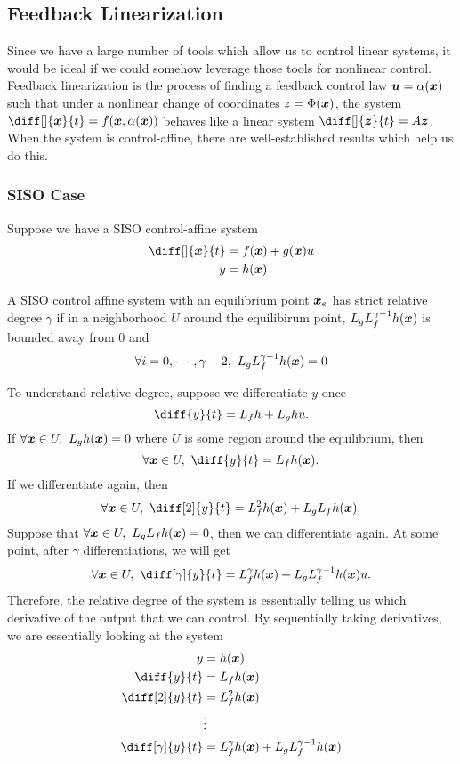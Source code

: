 \subsection{Feedback Linearization}
Since we have a large number of tools which allow us to control linear systems,
it would be ideal if we could somehow leverage those tools for nonlinear
control. Feedback linearization is the process of finding a feedback control law $\boldsymbol{u} =
\alpha(\boldsymbol{x})$ such that under a nonlinear change of coordinates $z =
\Phi(\boldsymbol{x})$, the system $\diff[]{\bs{x}}{t} = f(\bs{x}, \alpha(\bs{x}))$ behaves like a linear
system $\diff[]{\bs{z}}{t} = A\bs{z}$. When the system is control-affine, there
are well-established results which help us do this.

\subsubsection{SISO Case}
Suppose we have a SISO control-affine system \[
	\begin{aligned}
		\diff[]{\bs{x}}{t} &= f(\bs{x}) + g(\bs{x})u\\
		y &= h(\bs{x})
	\end{aligned}
\]
\begin{definition}
	A SISO control affine system with an equilibrium point $\boldsymbol{x}_e$ has
	strict relative degree $\gamma$ if in a neighborhood $U$ around the
	equilibirum point, $L_gL_f^{\gamma-1}h(\boldsymbol{x})$ is bounded away from 0 and \[
		\forall i=0,\cdots,\gamma-2,\ L_gL_f^{\gamma - 1}h(\bs{x}) = 0
	\]
	\label{defn:strict-relative-degree}
\end{definition}
To understand relative degree, suppose we differentiate $y$ once \[
	\diff{y}{t} = L_fh + L_gh u.
\]
If $\forall \boldsymbol{x}\in U,\ L_gh(\boldsymbol{x}) = 0$ where $U$ is some region around the
equilibrium, then \[
	\forall \bs{x}\in U,\ \diff{y}{t} = L_fh(\bs{x}).
\]
If we differentiate again, then \[
	\forall \bs{x}\in U,\ \diff[2]{y}{t} = L_f^2h(\bs{x}) + L_gL_fh(\bs{x}).
\]
Suppose that $\forall \boldsymbol{x}\in U,\ L_gL_fh(\boldsymbol{x}) = 0$, then we can
differentiate again. At some point, after $\gamma$ differentiations, we will
get \[
	\forall \bs{x}\in U,\ \diff[\gamma]{y}{t} = L_f^\gamma h(\bs{x}) +
	L_gL_f^{\gamma-1}h(\bs{x})u.
\]
Therefore, the relative degree of the system is essentially telling us which
derivative of the output that we can control. By sequentially taking
derivatives, we are essentially looking at the system \[
	\begin{aligned}
		y &= h(\bs{x})\\
		\diff{y}{t} &= L_fh(\bs{x})\\
		\diff[2]{y}{t} &= L_f^2h(\bs{x})\\
		&\vdots\\
		\diff[\gamma]{y}{t} &= L_f^\gamma h(\bs{x}) + L_gL_f^{\gamma-1}h(\bs{x})
	\end{aligned}
\]
